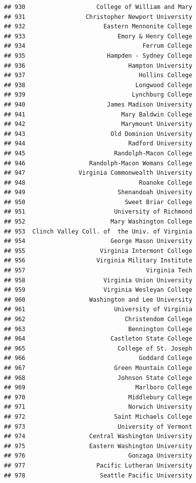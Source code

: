 \documentclass[]{article}
\begin{document}
\begin{verbatim}
## 930                    College of William and Mary
## 931                 Christopher Newport University
## 932                      Eastern Mennonite College
## 933                          Emory & Henry College
## 934                                 Ferrum College
## 935                       Hampden - Sydney College
## 936                             Hampton University
## 937                                Hollins College
## 938                               Longwood College
## 939                              Lynchburg College
## 940                       James Madison University
## 941                           Mary Baldwin College
## 942                           Marymount University
## 943                        Old Dominion University
## 944                             Radford University
## 945                         Randolph-Macon College
## 946                  Randolph-Macon Womans College
## 947               Virginia Commonwealth University
## 948                                Roanoke College
## 949                          Shenandoah University
## 950                            Sweet Briar College
## 951                         University of Richmond
## 952                        Mary Washington College
## 953  Clinch Valley Coll. of  the Univ. of Virginia
## 954                        George Mason University
## 955                     Virginia Intermont College
## 956                    Virginia Military Institute
## 957                                  Virginia Tech
## 958                      Virginia Union University
## 959                      Virginia Wesleyan College
## 960                  Washington and Lee University
## 961                         University of Virginia
## 962                            Christendom College
## 963                             Bennington College
## 964                        Castleton State College
## 965                          College of St. Joseph
## 966                                Goddard College
## 967                         Green Mountain College
## 968                          Johnson State College
## 969                               Marlboro College
## 970                             Middlebury College
## 971                             Norwich University
## 972                         Saint Michaels College
## 973                          University of Vermont
## 974                  Central Washington University
## 975                  Eastern Washington University
## 976                             Gonzaga University
## 977                    Pacific Lutheran University
## 978                     Seattle Pacific University

\end{verbatim}
\end{document}
